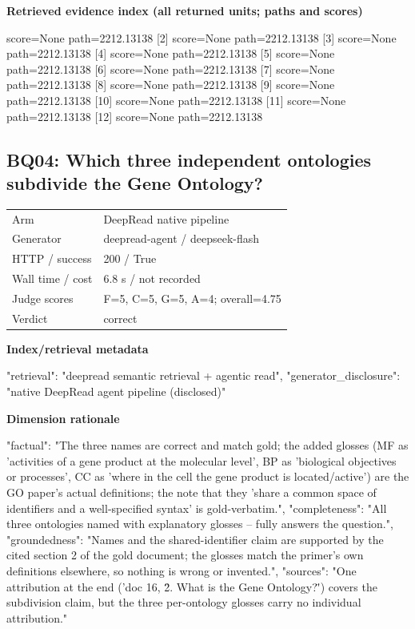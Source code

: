 \documentclass[10pt]{article}
\begin{document}
\textbf{Retrieved evidence index (all returned units; paths and scores) }
\begin{EvidenceText}
[1] score=None path=2212.13138
[2] score=None path=2212.13138
[3] score=None path=2212.13138
[4] score=None path=2212.13138
[5] score=None path=2212.13138
[6] score=None path=2212.13138
[7] score=None path=2212.13138
[8] score=None path=2212.13138
[9] score=None path=2212.13138
[10] score=None path=2212.13138
[11] score=None path=2212.13138
[12] score=None path=2212.13138
\end{EvidenceText}
\subsection{BQ04: Which three independent ontologies subdivide the Gene Ontology?}
\begin{tabular}{@{}ll@{}}
Arm & DeepRead native pipeline\\
Generator & deepread-agent / deepseek-flash\\
HTTP / success & 200 / True\\
Wall time / cost & 6.8 s / not recorded\\
Judge scores & F=5, C=5, G=5, A=4; overall=4.75\\
Verdict & correct\\
\end{tabular}

\textbf{Index/retrieval metadata}
\begin{EvidenceText}
{
  "retrieval": "deepread semantic retrieval + agentic read",
  "generator_disclosure": "native DeepRead agent pipeline (disclosed)"
}
\end{EvidenceText}

\textbf{Dimension rationale}
\begin{EvidenceText}
{
  "factual": "The three names are correct and match gold; the added glosses (MF as 'activities of a gene product at the molecular level', BP as 'biological objectives or processes', CC as 'where in the cell the gene product is located/active') are the GO paper's actual definitions; the note that they 'share a common space of identifiers and a well-specified syntax' is gold-verbatim.",
  "completeness": "All three ontologies named with explanatory glosses -- fully answers the question.",
  "groundedness": "Names and the shared-identifier claim are supported by the cited section 2 of the gold document; the glosses match the primer's own definitions elsewhere, so nothing is wrong or invented.",
  "sources": "One attribution at the end ('doc 16, \"2. What is the Gene Ontology?\"') covers the subdivision claim, but the three per-ontology glosses carry no individual attribution."
}
\end{EvidenceText}
\end{document}
